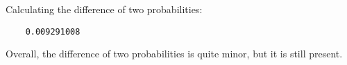 \documentclass[12pt,letterpaper]{article}
\begin{document}
\begin{enumerate}
\begin{enumerate}
\begin{itemize}
	Calculating the difference of two probabilities: 
	
		 
	
		\begin{verbatim}
	0.009291008 
	\end{verbatim}
	
Overall, the difference of two probabilities is quite minor, but it is still present.
	
\end{itemize}


	\end{enumerate}
	\end{enumerate}
\end{document}
